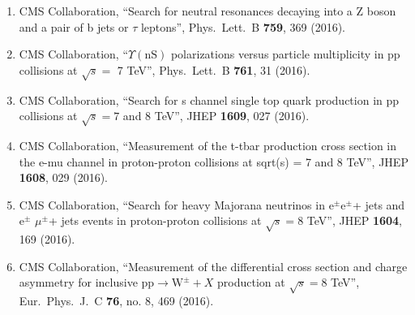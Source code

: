 \begin{itemize}
\begin{enumerate}
\item CMS Collaboration, ``Search for neutral resonances decaying into a Z boson and a pair of b jets or $\tau$ leptons'', Phys.\ Lett.\ B {\bf 759}, 369 (2016).

\item CMS Collaboration, ``$\Upsilon(\mathrm{nS})$ polarizations versus particle multiplicity in pp collisions at $\sqrt{s} =$ 7 TeV'', Phys.\ Lett.\ B {\bf 761}, 31 (2016).

\item CMS Collaboration, ``Search for s channel single top quark production in pp collisions at $ \sqrt{s}=7 $ and 8 TeV'', JHEP {\bf 1609}, 027 (2016).

\item CMS Collaboration, ``Measurement of the t-tbar production cross section in the e-mu channel in proton-proton collisions at sqrt(s) = 7 and 8 TeV'', JHEP {\bf 1608}, 029 (2016).

\item CMS Collaboration, ``Search for heavy Majorana neutrinos in e$^{±}$e$^{±}$+ jets and e$^{±}$ $\mu^{±}$+ jets events in proton-proton collisions at $ \sqrt{s}=8 $ TeV'', JHEP {\bf 1604}, 169 (2016).

\item CMS Collaboration, ``Measurement of the differential cross section and charge asymmetry for inclusive $\mathrm {p}\mathrm {p}\rightarrow \mathrm {W}^{\pm }+X$ production at ${\sqrt{s}} = 8$ TeV'', Eur.\ Phys.\ J.\ C {\bf 76}, no. 8, 469 (2016).


\end{enumerate}
\end{itemize}

